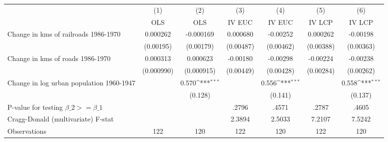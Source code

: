 {
\def\sym#1{\ifmmode^{#1}\else\(^{#1}\)\fi}
\begin{tabular}{l*{6}{c}}
\hline\hline
                &\multicolumn{1}{c}{(1)}&\multicolumn{1}{c}{(2)}&\multicolumn{1}{c}{(3)}&\multicolumn{1}{c}{(4)}&\multicolumn{1}{c}{(5)}&\multicolumn{1}{c}{(6)}\\
                &\multicolumn{1}{c}{OLS}&\multicolumn{1}{c}{OLS}&\multicolumn{1}{c}{IV EUC}&\multicolumn{1}{c}{IV EUC}&\multicolumn{1}{c}{IV LCP}&\multicolumn{1}{c}{IV LCP}\\
\hline
Change in kms of railroads 1986-1970& 0.000262         &-0.000169         & 0.000680         & -0.00252         & 0.000262         & -0.00198         \\
                &(0.00195)         &(0.00179)         &(0.00487)         &(0.00462)         &(0.00388)         &(0.00363)         \\
[1em]
Change in kms of roads 1986-1970& 0.000313         & 0.000623         & -0.00180         & -0.00298         & -0.00224         & -0.00238         \\
                &(0.000990)         &(0.000915)         &(0.00449)         &(0.00428)         &(0.00284)         &(0.00262)         \\
[1em]
Change in log urban population 1960-1947&                  &    0.570\sym{***}&                  &    0.556\sym{***}&                  &    0.558\sym{***}\\
                &                  &  (0.128)         &                  &  (0.141)         &                  &  (0.137)         \\
\hline
P-value for testing $\beta\_{2} >= \beta\_{1}$&                  &                  &    .2796         &    .4571         &    .2787         &    .4605         \\
Cragg-Donald (multivariate) F-stat&                  &                  &   2.3894         &   2.5033         &   7.2107         &   7.5242         \\
Observations    &      122         &      120         &      122         &      120         &      122         &      120         \\
\hline\hline
\end{tabular}
}
